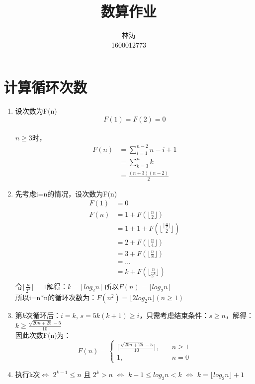\documentclass[UTF8]{ctexart}
\title{数算作业}
\author{林涛\\1600012773}
\begin{document}
\maketitle
\section{计算循环次数} %
\begin{enumerate}[(1)]
\item
	设次数为F(n)\\
	$$F(1)=F(2)=0$$\\
	$n\ge3$时，
	\[
		\begin{aligned}
			F(n)&=\sum_{i=1}^{n-2}n-i+1\\
			&=\sum_{k=3}^{n}k\\
			&=\frac{(n+3)(n-2)}{2}
		\end{aligned}
	\]
\item
	先考虑i=n的情况，设次数为F(n)\\
	\[
		\begin{aligned}
			F(1)&=0\\
			F(n)&=1 + F(\lfloor\frac{n}{2}\rfloor)\\
			&=1 + 1 + F(\lfloor\frac{\lfloor\frac{n}{2}\rfloor}{2}\rfloor) \\
			&=2 + F(\lfloor\frac{n}{4}\rfloor)\\
			&=3 + F(\lfloor\frac{n}{8}\rfloor)\\
			&=...\\
			&=k + F(\lfloor\frac{n}{2^k}\rfloor)\\
		\end{aligned}
	\]
	令$\lfloor\frac{n}{2^k}\rfloor=1$解得：$k=\lfloor log_2 n \rfloor$
	所以$F(n)=\lfloor log_2 n \rfloor$ \\
	所以i=n*n的循环次数为：$F(n^2)=\lfloor 2 log_2 n \rfloor(n\ge 1)$
\item
	第$k$次循环后：$i=k$, $s=5k(k+1)\ge i$，只需考虑结束条件：$s\ge n$，解得：
	$k \ge \frac{\sqrt{20n+25}-5}{10}$\\
	因此次数F(n)为：
	\[
		F(n)=\left \{
		\begin{aligned}
			\lceil \frac{\sqrt{20n+25}-5}{10} \rceil,\quad &n\ge 1\\
			1,\quad &n=0
		\end{aligned}
		\right .
	\]
	
\item
	执行k次$\iff$ $2^{k-1} \le n$ 且 $2^k > n$ $\iff$ $k-1\le log_2 n < k$ 
	$\iff$ $ k = \lfloor log_2 n \rfloor + 1$ \\
\end{enumerate}
\end{document}
